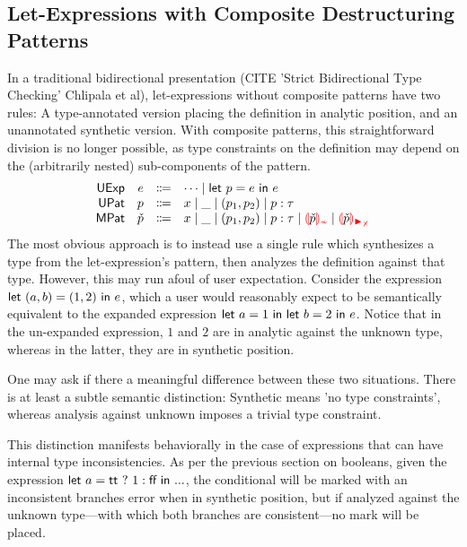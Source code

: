 \subsection{Let-Expressions with Composite Destructuring Patterns}
\label{sec:calculus-let}


In a traditional bidirectional presentation (CITE 'Strict Bidirectional Type Checking' Chlipala et al), let-expressions without composite patterns have two rules: A type-annotated version placing the definition in analytic position, and an unannotated synthetic version. With composite patterns, this straightforward division is no longer possible, as type constraints on the definition may depend on the (arbitrarily nested) sub-components of the pattern.
%
\[\begin{array}{rrcl}
  \EMName & \EMV & \Coloneqq & \cdots
                               \mid \ELet{\PMV}{\EMV}{\EMV} \\
  \PMName & \PMV & \Coloneqq & x 
                               \mid \_
                               \mid (p_1, p_2)
                               \mid p : \TMV \\
  \PCMName & \PCMV & \Coloneqq & x 
                               \mid \_
                               \mid (p_1, p_2)
                               \mid p : \TMV
                               \mid \ECInconType{\PCMV}
                               \mid \ECInconMatchedPair{\PCMV}
\end{array}\]
%
The most obvious approach is to instead use a single rule which synthesizes a type from the let-expression's pattern, then analyzes the definition against that type. However, this may run afoul of user expectation. Consider the expression $\textsf{let}~ (a,b) = (1,2) ~\textsf{in}~ e$, which a user would reasonably expect to be semantically equivalent to the expanded expression $\textsf{let}~ a = 1 ~\textsf{in}~ \textsf{let}~ b = 2 ~\textsf{in}~ e$. Notice that in the un-expanded expression, $1$ and $2$ are in analytic against the unknown type, whereas in the latter, they are in synthetic position.

One may ask if there a meaningful difference between these two situations. There is at least a subtle semantic distinction: Synthetic means 'no type constraints', whereas analysis against unknown imposes a trivial type constraint.

This distinction manifests behaviorally in the case of expressions that can have internal type inconsistencies. As per the previous section on booleans, given the expression $\textsf{let}~ a = {\normalfont\textsf{tt}} ~?~ 1 : {\normalfont\textsf{ff}} ~\textsf{in}~ ...$, the conditional will be marked with an inconsistent branches error when in synthetic position, but if analyzed against the unknown type---with which both branches are consistent---no mark will be placed.

